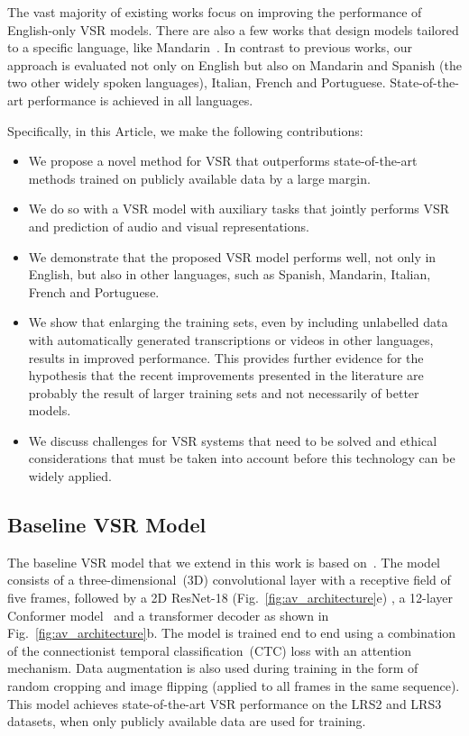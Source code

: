 \documentclass[twocolumn]{article}
\begin{document}
The vast majority of existing works focus on improving the performance of English-only VSR models. There are also a few works that design models tailored to a specific language, like Mandarin~\cite{DBLP:conf/aaai/ZhangGDYL019, zhao2019cascade,ma2020transformer}. In contrast to previous works, our approach is evaluated not only on English but also on Mandarin and Spanish (the two other widely spoken languages), Italian, French and Portuguese. State-of-the-art performance is achieved in all languages.

Specifically, in this Article, we make the following contributions:
\begin{itemize}

    \item We propose a novel method for VSR that outperforms state-of-the-art methods trained on publicly available data by a large margin.

    \item We do so with a VSR model with auxiliary tasks that jointly performs VSR and prediction of audio and visual representations.

    \item We demonstrate that the proposed VSR model performs well, not only in English, but also in other languages, such as Spanish, Mandarin, Italian, French and Portuguese.
    
    \item We show that enlarging the training sets, even by including unlabelled data with automatically generated transcriptions or videos in other languages, results in improved performance. This provides further evidence for the hypothesis that the recent improvements presented in the literature are probably the result of larger training sets and not necessarily of better models.

    \item We discuss challenges for VSR systems that need to be solved and ethical considerations that must be taken into account before this technology can be widely applied.

\end{itemize}

\subsection{Baseline VSR Model}
\label{ssec:VSR_model}
The baseline VSR model that we extend in this work is based on~\cite{DBLP:journals/corr/abs-2102-06657}. The model consists of a three-dimensional~(3D) convolutional layer with a receptive field of five frames, followed by a 2D ResNet-18 (Fig.~\ref{fig:av_architecture}e)
, a 12-layer Conformer model~\cite{gulati2020conformer} and a transformer decoder as shown in Fig.~\ref{fig:av_architecture}b. The model is trained end to end using a combination of the connectionist temporal classification~(CTC) loss with an attention mechanism. Data augmentation is also used during training in the form of random cropping and image flipping (applied to all frames in the same sequence). This model achieves state-of-the-art VSR performance on the LRS2 and LRS3 datasets, when only publicly available data are used for training.
\end{document}
